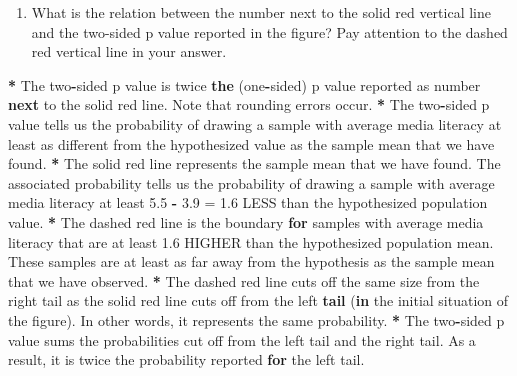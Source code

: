 \documentclass[a4paper]{book}
\newenvironment{Shaded}{\begin{snugshade}}{\end{snugshade}}
\newcommand{\KeywordTok}[1]{\textcolor[rgb]{0,0,0}{\textbf{#1}}}
\newcommand{\FloatTok}[1]{\textcolor[rgb]{0.00,0.00,0.00}{#1}}
\newcommand{\StringTok}[1]{\textcolor[rgb]{0.00,0.00,0.00}{#1}}
\newcommand{\ControlFlowTok}[1]{\textcolor[rgb]{0.00,0.00,0.00}{\textbf{#1}}}
\newcommand{\OperatorTok}[1]{\textcolor[rgb]{0.00,0.00,0.00}{\textbf{#1}}}
\newcommand{\NormalTok}[1]{#1}
\providecommand{\tightlist}{%
  \setlength{\itemsep}{0pt}\setlength{\parskip}{0pt}}
\theoremstyle{definition}
\theoremstyle{definition}
\theoremstyle{definition}
\theoremstyle{remark}
\begin{document}
\begin{enumerate}
\def\labelenumi{\arabic{enumi}.}
\setcounter{enumi}{1}
\tightlist
\item
  What is the relation between the number next to the solid red vertical
  line and the two-sided p value reported in the figure? Pay attention
  to the dashed red vertical line in your answer.
\end{enumerate}

\begin{Shaded}
\begin{Highlighting}[]
\OperatorTok{*}\StringTok{ }\NormalTok{The two}\OperatorTok{-}\NormalTok{sided p value is twice }\KeywordTok{the}\NormalTok{ (one}\OperatorTok{-}\NormalTok{sided) p value reported as number}
\ControlFlowTok{next}\NormalTok{ to the solid red line. Note that rounding errors occur.}
\OperatorTok{*}\StringTok{ }\NormalTok{The two}\OperatorTok{-}\NormalTok{sided p value tells us the probability of drawing a sample with}
\NormalTok{average media literacy at least as different from the hypothesized value as the}
\NormalTok{sample mean that we have found.}
\OperatorTok{*}\StringTok{ }\NormalTok{The solid red line represents the sample mean that we have found. The}
\NormalTok{associated probability tells us the probability of drawing a sample with}
\NormalTok{average media literacy at least }\FloatTok{5.5} \OperatorTok{-}\StringTok{ }\FloatTok{3.9}\NormalTok{ =}\StringTok{ }\FloatTok{1.6}\NormalTok{ LESS than the hypothesized}
\NormalTok{population value.}
\OperatorTok{*}\StringTok{ }\NormalTok{The dashed red line is the boundary }\ControlFlowTok{for}\NormalTok{ samples with average media literacy}
\NormalTok{that are at least }\FloatTok{1.6}\NormalTok{ HIGHER than the hypothesized population mean. These}
\NormalTok{samples are at least as far away from the hypothesis as the sample mean that we}
\NormalTok{have observed.}
\OperatorTok{*}\StringTok{ }\NormalTok{The dashed red line cuts off the same size from the right tail as the solid}
\NormalTok{red line cuts off from the left }\KeywordTok{tail}\NormalTok{ (}\ControlFlowTok{in}\NormalTok{ the initial situation of the figure).}
\NormalTok{In other words, it represents the same probability.}
\OperatorTok{*}\StringTok{ }\NormalTok{The two}\OperatorTok{-}\NormalTok{sided p value sums the probabilities cut off from the left tail and}
\NormalTok{the right tail. As a result, it is twice the probability reported }\ControlFlowTok{for}\NormalTok{ the left}
\NormalTok{tail.}
\end{Highlighting}
\end{Shaded}
\end{document}
